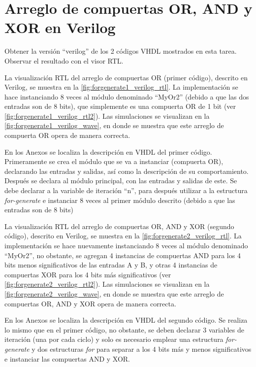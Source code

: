 \section{Arreglo de compuertas OR, AND y XOR en Verilog \label{sec:s3}}

\begin{center}
	\begin{minipage}{12cm}
		\begin{tcolorbox}[title=Actividad 3]
			Obtener la versión “verilog” de los 2 códigos VHDL mostrados en esta tarea. Observar el resultado con el visor RTL.
		\end{tcolorbox}	
	\end{minipage}
\end{center}

La visualización RTL del arreglo de compuertas OR (primer código), descrito en Verilog, se muestra en la \autoref{fig:forgenerate1_verilog_rtl}. La implementación se hace instanciando 8 veces al módulo denominado ``MyOr2'' (debido a que las dos entradas son de 8 bits), que simplemente es una compuerta OR de 1 bit (ver \autoref{fig:forgenerate1_verilog_rtl2}). Las simulaciones se visualizan en la \autoref{fig:forgenerate1_verilog_wave}, en donde se muestra que este arreglo de compuerta OR opera de manera correcta.

En los Anexos se localiza la descripción en VHDL del primer código. Primeramente se crea el módulo que se va a instanciar (compuerta OR), declarando las entradas y salidas, así como la descripción de su comportamiento. Después se declara al módulo principal, con las entradas y salidas de este. Se debe declarar a la variable de iteración ``n'', para después utilizar a la estructura \textit{for-generate} e instanciar 8 veces al primer módulo descrito (debido a que las entradas son de 8 bits)

La visualización RTL del arreglo de compuertas OR, AND y XOR (segundo código), descrito en Verilog, se muestra en la \autoref{fig:forgenerate2_verilog_rtl}. La implementación se hace nuevamente instanciando 8 veces al módulo denominado ``MyOr2'', no obstante, se agregan 4 instancias de compuertas AND para los 4 bits menos significativos de las entradas A y B, y otras 4 instancias de compuertas XOR para los 4 bits más significativos (ver \autoref{fig:forgenerate2_verilog_rtl2}). Las simulaciones se visualizan en la \autoref{fig:forgenerate2_verilog_wave}, en donde se muestra que este arreglo de compuertas OR, AND y XOR opera de manera correcta.

En los Anexos se localiza la descripción en VHDL del segundo código. Se realiza lo mismo que en el primer código, no obstante, se deben declarar 3 variables de iteración (una por cada ciclo) y solo es necesario emplear una estructura \textit{for-generate} y dos estructuras \textit{for} para separar a los 4 bits más y menos significativos e instanciar las compuertas AND y XOR. 


